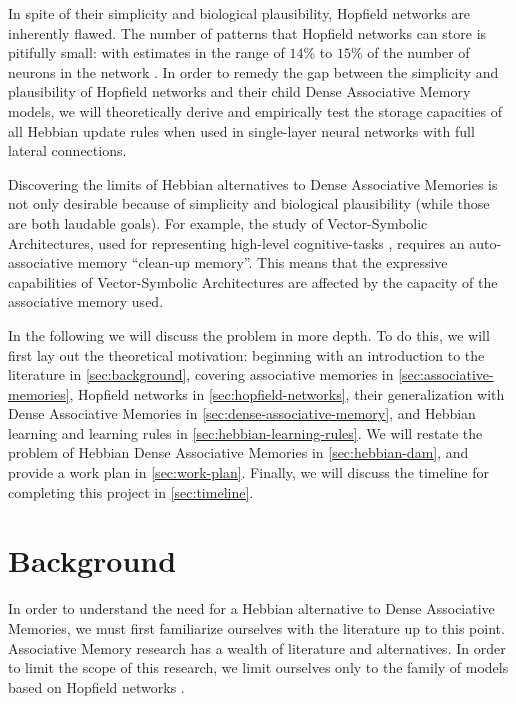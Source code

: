 \documentclass{article}
\theoremstyle{definition}
\begin{document}
In spite of their simplicity and biological plausibility, Hopfield networks
are inherently flawed. The number of patterns that Hopfield networks
can store is pitifully small: with estimates in the range of $14\%$ to $15\%$
of the number of neurons in the network
\parencites{hopfield_neural_1982,amit_statistical_1987}.
In order to remedy the gap between the simplicity and plausibility of
Hopfield networks
and their child Dense Associative Memory models, we will theoretically derive
and empirically test the storage capacities of all Hebbian update rules
when used in single-layer neural networks with full lateral connections.

Discovering the limits of Hebbian alternatives to Dense Associative Memories
is not only desirable because of simplicity and biological plausibility
(while those are both laudable goals). For example, the study of
Vector-Symbolic Architectures, used for representing high-level cognitive-tasks
\parencites{smolensky_tensor_1990,plate_holographic_1995,gayler_multiplicative_1998,kelly_encoding_2013},
requires an auto-associative memory ``clean-up memory''. This means that
the expressive capabilities of Vector-Symbolic Architectures are
affected by the capacity of the associative memory used.

In the following we will discuss the problem in more depth. To do
this, we will first
lay out the theoretical motivation: beginning with an introduction to
the literature
in \autoref{sec:background}, covering associative memories in
\autoref{sec:associative-memories},
Hopfield networks in \autoref{sec:hopfield-networks}, their generalization with
Dense Associative Memories in \autoref{sec:dense-associative-memory},
and Hebbian learning
and learning rules in \autoref{sec:hebbian-learning-rules}. We will restate the
problem of Hebbian Dense Associative Memories in \autoref{sec:hebbian-dam}, and
provide a work plan in \autoref{sec:work-plan}. Finally, we will discuss
the timeline for completing this project in \autoref{sec:timeline}.

\section{Background}\label{sec:background}

In order to understand the need for a Hebbian alternative to Dense Associative
Memories, we must first familiarize ourselves with the literature up to this
point. Associative Memory research has a wealth of literature and alternatives.
In order to limit the scope of this research, we limit ourselves only to the
family of models based on Hopfield networks \parencite{hopfield_neural_1982}.
\end{document}

